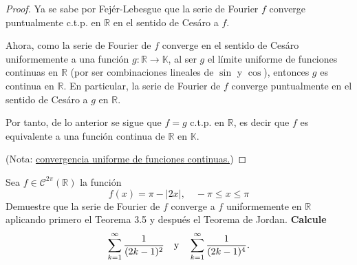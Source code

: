 \documentclass[12pt]{report}
\newcounter{it}
\theoremstyle{largebreak}
\renewcommand{\leq}{\ensuremath{\leqslant}}
\newcommand\abs[1]{\ensuremath{\left|#1\right|}}
\newcommand\cf[3]{\ensuremath{#1:#2\rightarrow#3}}
\begin{document}
    \begin{proof}
        Ya se sabe por Fejér-Lebesgue que la serie de Fourier $f$ converge puntualmente c.t.p. en $\mathbb{R}$ en el sentido de Cesáro a $f$.

        Ahora, como la serie de Fourier de $f$ converge en el sentido de Cesáro uniformemente a una función $\cf{g}{\mathbb{R}}{\mathbb{K}}$, al ser $g$ el límite uniforme de funciones continuas en $\mathbb{R}$ (por ser combinaciones lineales de $\sin$ y $\cos$), entonces $g$ es continua en $\mathbb{R}$. En particular, la serie de Fourier de $f$ converge puntualmente en el sentido de Cesáro a $g$ en $\mathbb{R}$.

        Por tanto, de lo anterior se sigue que $f=g$ c.t.p. en $\mathbb{R}$, es decir que $f$ es equivalente a una función continua de $\mathbb{R}$ en $\mathbb{K}$.

        (Nota: \href{https://mathcs.org/analysis/reals/funseq/proofs/uconvcont.html#:~:text=If%20a%20sequence%20of%20functions,is%20also%20continuous%20on%20D.&text=as%20long%20as%20%7Cx0,is%20continuous%20at%20x0}{convergencia uniforme de funciones continuas.})
    \end{proof}

    \begin{excer}
        Sea $f\in\mathcal{C}^{2\pi}(\mathbb{R})$ la función
        \begin{equation*}
            f(x)=\pi-\abs{2x},\quad-\pi\leq x\leq\pi
        \end{equation*}
        Demuestre que la serie de Fourier de $f$ converge a $f$ uniformemente en $\mathbb{R}$ aplicando primero el Teorema 3.5 y después el Teorema de Jordan. \textbf{Calcule}
        \begin{equation*}
            \sum_{ k=1}^\infty\frac{1}{(2k-1)^2}\quad\textup{y}\quad\sum_{ k=1}^\infty\frac{1}{(2k-1)^4}.
        \end{equation*}
    \end{excer}
\end{document}

